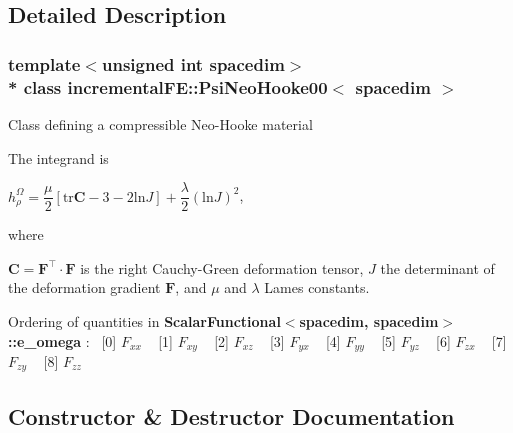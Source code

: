 \subsection{Detailed Description}
\subsubsection*{template$<$unsigned int spacedim$>$\\*
class incremental\+F\+E\+::\+Psi\+Neo\+Hooke00$<$ spacedim $>$}

Class defining a compressible Neo-\/\+Hooke material

The integrand is

$h^\Omega_\rho = \dfrac{\mu}{2} \left[ \mathrm{tr}\boldsymbol{C} - 3 - 2 \mathrm{ln}J \right] + \dfrac{\lambda}{2} \left(\mathrm{ln}J\right)^2$,

where

$ \boldsymbol{C} =\boldsymbol{F}^\top \cdot \boldsymbol{F} $ is the right Cauchy-\/\+Green deformation tensor, $J$ the determinant of the deformation gradient $\boldsymbol{F}$, and $\mu$ and $\lambda$ Lame\textquotesingle{}s constants.

Ordering of quantities in {\bf Scalar\+Functional$<$spacedim, spacedim$>$\+::e\+\_\+omega} \+:~\newline
 \mbox{[}0\mbox{]} $F_{xx}$ ~\newline
 \mbox{[}1\mbox{]} $F_{xy}$ ~\newline
 \mbox{[}2\mbox{]} $F_{xz}$ ~\newline
 \mbox{[}3\mbox{]} $F_{yx}$ ~\newline
 \mbox{[}4\mbox{]} $F_{yy}$ ~\newline
 \mbox{[}5\mbox{]} $F_{yz}$ ~\newline
 \mbox{[}6\mbox{]} $F_{zx}$ ~\newline
 \mbox{[}7\mbox{]} $F_{zy}$ ~\newline
 \mbox{[}8\mbox{]} $F_{zz}$ ~\newline
 

\subsection{Constructor \& Destructor Documentation}

